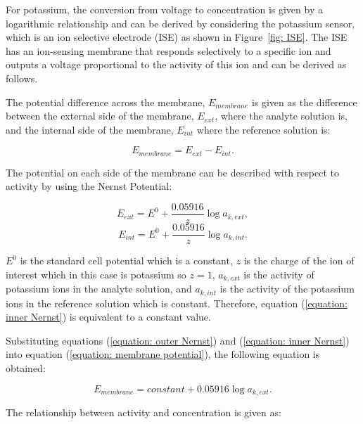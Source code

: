 For potassium, the conversion from voltage to concentration is given by a logarithmic relationship and can be derived by considering the potassium sensor, which is an ion selective electrode (ISE) as shown in Figure~\ref{fig: ISE}. The ISE has an ion-sensing membrane that responds selectively to a specific ion and outputs a voltage proportional to the activity of this ion \cite{Rogers2017, LibreTexts2019} and can be derived as follows. 

The potential difference across the membrane, $E_{membrane}$ is given as the difference between the external side of the membrane, $E_{ext}$, where the analyte solution is, and the internal side of the membrane, $E_{int}$ where the reference solution is:

\begin{equation}
    E_{membrane} = E_{ext} - E_{int}.
    \label{equation: membrane potential}
\end{equation}

The potential on each side of the membrane can be described with respect to activity by using the Nernst Potential:

\begin{equation}
    E_{ext} = E^{0} + \frac{0.05916}{z}\log a_{k,ext}, 
    \label{equation: outer Nernst} 
\end{equation}
\begin{equation}
    E_{int} = E^{0} + \frac{0.05916}{z}\log a_{k,int}.
    \label{equation: inner Nernst}
\end{equation}

\noindent $E^{0}$ is the standard cell potential which is a constant, $z$ is the charge of the ion of interest which in this case is potassium so $z=1$, $a_{k,ext}$ is the activity of potassium ions in the analyte solution, and $a_{k,int}$ is the activity of the potassium ions in the reference solution which is constant. Therefore, equation (\ref{equation: inner Nernst}) is equivalent to a constant value.

Substituting equations (\ref{equation: outer Nernst}) and (\ref{equation: inner Nernst}) into equation (\ref{equation: membrane potential}), the following equation is obtained:

\begin{equation}
    E_{membrane} = constant + 0.05916\log a_{k,ext}.
    \label{equation: membrane potential 2}
\end{equation}

The relationship between activity and concentration is given as:

